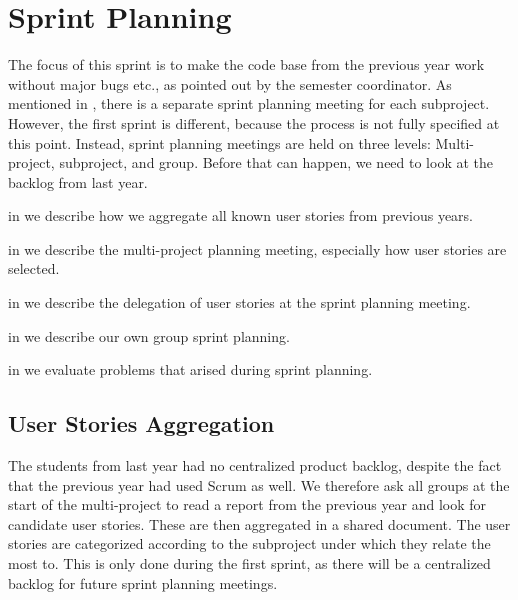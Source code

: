 \chapter{Sprint Planning}\label{chap:sprint1_planning}
The focus of this sprint is to make the code base from the previous year work without major bugs etc., as pointed out by the semester coordinator. As mentioned in , there is a separate sprint planning meeting for each subproject. However, the first sprint is different, because the process is not fully specified at this point. Instead, sprint planning meetings are held on three levels: Multi-project, subproject, and group. Before that can happen, we need to look at the backlog from last year.

\begin{chapterorganization}
  \item in  we describe how we aggregate all known user stories from previous years.
  \item in  we describe the multi-project planning meeting, especially how user stories are selected.
  \item in  we describe the delegation of user stories at the \bd sprint planning meeting.
  \item in  we describe our own group sprint planning.
  \item in  we evaluate problems that arised during sprint planning.
\end{chapterorganization}

\section{User Stories Aggregation}\label{sec:s1p_userstory}
The students from last year had no centralized product backlog, despite the fact that the previous year had used Scrum as well. We therefore ask all groups at the start of the multi-project to read a report from the previous year and look for candidate user stories. These are then aggregated in a shared document. The user stories are categorized according to the subproject under which they relate the most to. This is only done during the first sprint, as there will be a centralized backlog for future sprint planning meetings.

